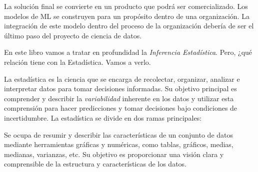\documentclass[
  letterpaper,
  DIV=11,
  numbers=noendperiod]{scrreprt}
\begin{document}
\begin{tcolorbox}[enhanced jigsaw, arc=.35mm, breakable, coltitle=black, left=2mm, opacityback=0, bottomtitle=1mm, colbacktitle=quarto-callout-note-color!10!white, title=\textcolor{quarto-callout-note-color}{\faInfo}\hspace{0.5em}{Despliegue en producción}, titlerule=0mm, colback=white, colframe=quarto-callout-note-color-frame, bottomrule=.15mm, rightrule=.15mm, opacitybacktitle=0.6, toptitle=1mm, toprule=.15mm, leftrule=.75mm]

La solución final se convierte en un producto que podrá ser
comercializado. Los modelos de ML se construyen para un propósito dentro
de una organización. La integración de este modelo dentro del proceso de
la organización debería de ser el último paso del proyecto de ciencia de
datos.

\end{tcolorbox}

En este libro vamos a tratar en profundidad la \emph{Inferencia
Estadística}. Pero, ¿qué relación tiene con la Estadística. Vamos a
verlo.

La estadística es la ciencia que se encarga de recolectar, organizar,
analizar e interpretar datos para tomar decisiones informadas. Su
objetivo principal es comprender y describir la \emph{variabilidad}
inherente en los datos y utilizar esta comprensión para hacer
predicciones y tomar decisiones bajo condiciones de incertidumbre. La
estadística se divide en dos ramas principales:

\begin{tcolorbox}[enhanced jigsaw, arc=.35mm, breakable, coltitle=black, left=2mm, opacityback=0, bottomtitle=1mm, colbacktitle=quarto-callout-note-color!10!white, title=\textcolor{quarto-callout-note-color}{\faInfo}\hspace{0.5em}{Estadística Descriptiva}, titlerule=0mm, colback=white, colframe=quarto-callout-note-color-frame, bottomrule=.15mm, rightrule=.15mm, opacitybacktitle=0.6, toptitle=1mm, toprule=.15mm, leftrule=.75mm]

Se ocupa de resumir y describir las características de un conjunto de
datos mediante herramientas gráficas y numéricas, como tablas, gráficos,
medias, medianas, varianzas, etc. Su objetivo es proporcionar una visión
clara y comprensible de la estructura y características de los datos.

\end{tcolorbox}
\end{document}
